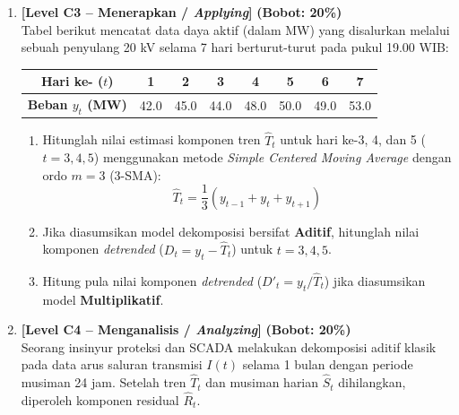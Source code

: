 \documentclass[11pt,a4paper]{article}
\begin{document}
\begin{enumerate}[leftmargin=1.5em, label=\textbf{Soal \arabic*.}]
    \newpage

    \item \textbf{[Level C3 -- Menerapkan / \textit{Applying}]} \hfill \textbf{(Bobot: 20\%)} \\
    Tabel berikut mencatat data daya aktif (dalam MW) yang disalurkan melalui sebuah penyulang 20 kV selama 7 hari berturut-turut pada pukul 19.00 WIB:
    
    \begin{center}
    \begin{tabular}{|c|c|c|c|c|c|c|c|}
    \hline
    \rowcolor{boxbg}
    \textbf{Hari ke- ($t$)} & 1 & 2 & 3 & 4 & 5 & 6 & 7 \\ \hline
    \textbf{Beban $y_t$ (MW)} & 42.0 & 45.0 & 44.0 & 48.0 & 50.0 & 49.0 & 53.0 \\ \hline
    \end{tabular}
    \end{center}

    \begin{enumerate}[label=\alph*.]
        \item Hitunglah nilai estimasi komponen tren $\hat{T}_t$ untuk hari ke-3, 4, dan 5 ($t=3, 4, 5$) menggunakan metode \textit{Simple Centered Moving Average} dengan ordo $m = 3$ ($3$-SMA):
        \begin{equation*}
            \hat{T}_t = \frac{1}{3}(y_{t-1} + y_t + y_{t+1})
        \end{equation*}
        \item Jika diasumsikan model dekomposisi bersifat \textbf{Aditif}, hitunglah nilai komponen \textit{detrended} ($D_t = y_t - \hat{T}_t$) untuk $t=3, 4, 5$.
        \item Hitung pula nilai komponen \textit{detrended} ($D'_t = y_t / \hat{T}_t$) jika diasumsikan model \textbf{Multiplikatif}.
    \end{enumerate}

    \vspace{0.4cm}

    \item \textbf{[Level C4 -- Menganalisis / \textit{Analyzing}]} \hfill \textbf{(Bobot: 20\%)} \\
    Seorang insinyur proteksi dan SCADA melakukan dekomposisi aditif klasik pada data arus saluran transmisi $I(t)$ selama 1 bulan dengan periode musiman 24 jam. Setelah tren $\hat{T}_t$ dan musiman harian $\hat{S}_t$ dihilangkan, diperoleh komponen residual $\hat{R}_t$.
    

\end{enumerate}
\end{document}
